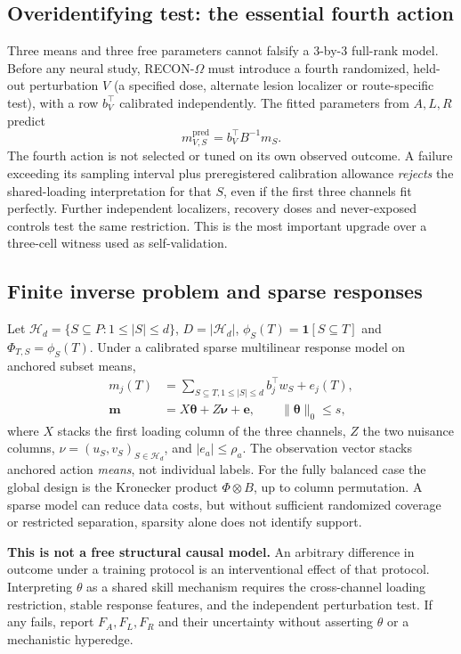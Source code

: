 \documentclass[11pt,a4paper]{article}
\newcommand{\Hh}{\mathcal{H}}\newcommand{\V}{\mathcal{V}}
\newcommand{\ind}{\mathbf{1}}\newcommand{\supp}{\mathrm{supp}}
\theoremstyle{definition}\newtheorem{definition}[theorem]{Definition}
\theoremstyle{remark}\newtheorem{remark}[theorem]{Remark}
\begin{document}
\subsection{Overidentifying test: the essential fourth action}
Three means and three free parameters cannot falsify a 3-by-3 full-rank model. Before any neural study, RECON-$\Omega$ must introduce a fourth randomized, held-out perturbation $V$ (a specified dose, alternate lesion localizer or route-specific test), with a row $b_V^\top$ calibrated independently. The fitted parameters from $A,L,R$ predict
\begin{equation}\label{eq:overidentification}
 m_{V,S}^{\mathrm{pred}}=b_V^\top B^{-1}m_S.
\end{equation}
The fourth action is not selected or tuned on its own observed outcome. A failure exceeding its sampling interval plus preregistered calibration allowance \emph{rejects} the shared-loading interpretation for that $S$, even if the first three channels fit perfectly. Further independent localizers, recovery doses and never-exposed controls test the same restriction. This is the most important upgrade over a three-cell witness used as self-validation.

\subsection{Finite inverse problem and sparse responses}
Let $\Hh_d=\{S\subseteq P:1\le |S|\le d\}$, $D=|\Hh_d|$, $\phi_S(T)=\ind[S\subseteq T]$ and $\Phi_{T,S}=\phi_S(T)$. Under a calibrated sparse multilinear response model on anchored subset means,
\begin{align}\label{eq:factor}
 m_j(T)&=\sum_{S\subseteq T,1\le|S|\le d}b_j^\top w_S+e_j(T),\\
 \bm m&=X\bm\theta+Z\bm\nu+\bm e, \qquad \|\bm\theta\|_0\le s,
\end{align}
where $X$ stacks the first loading column of the three channels, $Z$ the two nuisance columns, $\nu=(u_S,v_S)_{S\in\Hh_d}$, and $|e_a|\le\rho_a$. The observation vector stacks anchored action \emph{means}, not individual labels. For the fully balanced case the global design is the Kronecker product $\Phi\otimes B$, up to column permutation. A sparse model can reduce data costs, but without sufficient randomized coverage or restricted separation, sparsity alone does not identify support.

\textbf{This is not a free structural causal model.} An arbitrary difference in outcome under a training protocol is an interventional effect of that protocol. Interpreting $\theta$ as a shared skill mechanism requires the cross-channel loading restriction, stable response features, and the independent perturbation test. If any fails, report $F_A,F_L,F_R$ and their uncertainty without asserting $\theta$ or a mechanistic hyperedge.
\end{document}
